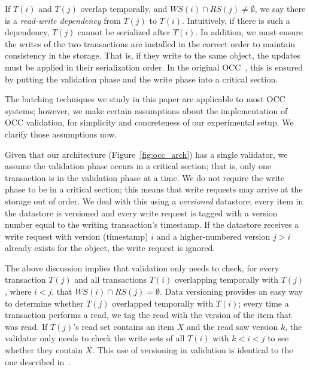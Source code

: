 If $T(i)$ and $T(j)$ overlap temporally, and $WS(i) \cap RS(j) \neq \emptyset$, we say there is a \emph{read-write dependency} from $T(j)$ to $T(i)$. Intuitively, if there is such a dependency, $T(j)$ cannot be serialized after $T(i)$. In addition, we must ensure the writes of the two transactions are installed in the correct order to maintain consistency in the storage. That is, if they write to the same object, the updates must be applied in their serialization order. In the original OCC~\cite{kung81tods}, this is ensured by putting the validation phase and the write phase into a critical section.

The batching techniques we study in this paper are applicable to most OCC systems; however, we make certain assumptions about the implementation of OCC validation, for simplicity and concreteness of our experimental setup. We clarify those assumptions now.

Given that our architecture (Figure~\ref{fig:occ_arch}) has a single validator, we assume the validation phase occurs in a critical section; that is, only one transaction is in the validation phase at a time. We do not require the write phase to be in a critical section; this means that write requests may arrive at the storage out of order. We deal with this using a \emph{versioned} datastore; every item in the datastore is versioned and every write request is tagged with a version number equal to the writing transaction's timestamp. If the datastore receives a write request with version (timestamp) $i$ and a higher-numbered version $j > i$ already exists for the object, the write request is ignored. 

The above discussion implies that validation only needs to check, for every transaction $T(j)$ and all transactions $T(i)$ overlapping temporally with $T(j)$, where $i<j$, that $WS(i) \cap RS(j) = \emptyset$. Data versioning provides an easy way to determine whether $T(j)$ overlapped temporally with $T(i)$; every time a transaction performs a read, we tag the read with the version of the item that was read. If $T(j)$'s read set contains an item $X$ and the read saw version $k$, the validator only needs to check the write sets of all $T(i)$ with $k < i < j$ to see whether they contain $X$. This use of versioning in validation is identical to the one described in~\cite{ding2015centiman}.


